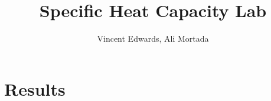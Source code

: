\documentclass[12pt]{article} %
\title{Specific Heat Capacity Lab}
\author{Vincent Edwards, Ali Mortada}
\begin{document}
\maketitle
\newpage

\section{Results}
\end{document}
